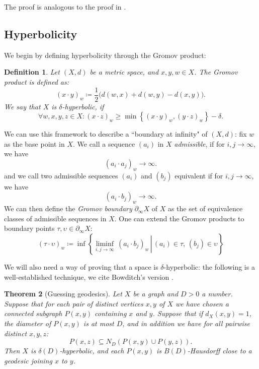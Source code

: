 \documentclass[10pt,a4paper]{amsart}
\newtheorem{theorem}{Theorem}[section]
\newtheorem{definition}[theorem]{Definition}
\begin{document}
The proof is analogous to the proof in \cite{BHMMW}.

\subsection{Hyperbolicity}
We begin by defining hyperbolicity through the Gromov product:

\begin{definition}
Let $(X,d)$ be a metric space, and $x,y,w\in X$.
The \emph{Gromov product} is defined as:
\begin{equation*}
    ( x\cdot y)_w \coloneqq \frac{1}{2}\big( d(w,x) + d(w,y) - d(x,y)  \big).
\end{equation*}
We say that $X$ is $\delta$-hyperbolic, if 
\[\forall w,x,y,z \in X\colon ( x\cdot z )_w \geq \min\left\{ ( x\cdot y)_w, (y\cdot z)_w \right\} - \delta.\]
\end{definition}

We can use this framework to describe a ``boundary at infinity" of $(X,d)$:
fix $w$ as the base point in $X$.
We call a sequence $(a_i)$ in $X$ \emph{admissible}, if for $i,j \rightarrow \infty$, we have
\[(a_i\cdot a_j)_w \rightarrow \infty.\]
and we call two admissible sequences $(a_i)$ and $(b_j)$ equivalent if for $i,j\rightarrow \infty$, we have
\[(a_i\cdot b_j)_w \rightarrow \infty.\]
We can then define the \emph{Gromov boundary} $\partial_\infty X$ of $X$ as the set of equivalence classes of admissible sequences in $X$.
One can extend the Gromov products to boundary points $\tau, \upsilon \in \partial_\infty X$:
\[(\tau\cdot \upsilon)_w \coloneqq \inf \left\{\left. \liminf_{i,j\rightarrow \infty}\, (a_i\cdot b_j)_w \,\right|\, (a_i)\in \tau,\, (b_j)\in \upsilon \right\}\]

We will also need a way of proving that a space is $\delta$-hyperbolic:
the following is a well-established technique, we cite Bowditch's version \cite{Bowditch_unif-hyp}.

\begin{theorem}[Guessing geodesics]\label{thm:bowditch-guessing-geodesics}
    Let $X$ be a graph and $D>0$ a number.
    Suppose that for each pair of distinct vertices $x,y$ of $X$ we have chosen a connected subgraph $P(x,y)$ containing $x$ and $y$.
    Suppose that if $d_X(x,y) = 1$, the diameter of $P(x,y)$ is at most $D$, and in addition we have for all pairwise distinct $x,y,z$:
    \[ P(x,z) \subseteq N_D(P(x,y)\cup P(y,z)). \]
    Then $X$ is $\delta(D)$-hyperbolic, and each $P(x,y)$ is $B(D)$-Hausdorff close to a geodesic joining $x$ to $y$.
\end{theorem}
\end{document}
